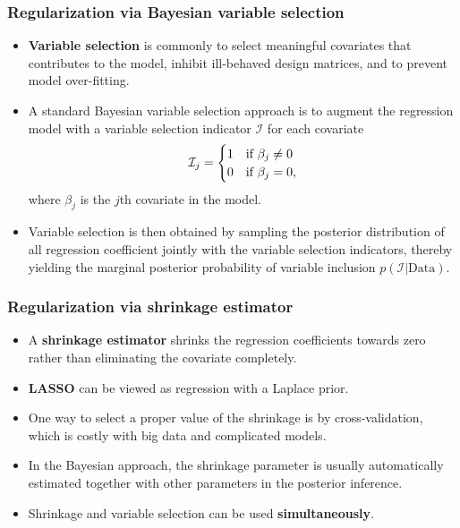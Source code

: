 \documentclass[11pt]{beamer}
\begin{document}
\begin{frame}
  \frametitle{Regularization via Bayesian variable selection}

  \begin{itemize}
  \item \textbf{Variable selection} is commonly to select meaningful covariates that
    contributes to the model, inhibit ill-behaved design matrices, and to
    prevent model over-fitting.

  \item A standard Bayesian variable selection approach \citep{nott2005adaptive} is to augment the
    regression model with a variable selection indicator $\mathcal{I}$ for each
    covariate
    \[
    \mathcal{I}_{j}=\begin{cases}
      1 & \text{if \ensuremath{\beta_{j}\neq0}}\\
      0 & \text{if \ensuremath{\beta_{j}=0}},
    \end{cases}
    \]
    where $\beta_{j}$ is the $j$th covariate in the model.


  \item Variable selection is then obtained by sampling the posterior
    distribution of all regression coefficient jointly with the variable
    selection indicators, thereby yielding the marginal posterior probability of
    variable inclusion $p(\mathcal{I}|\text{Data})$.

  \end{itemize}
\end{frame}

\begin{frame}
  \frametitle{Regularization via shrinkage estimator}

  \begin{itemize}
  \item A \textbf{shrinkage estimator} shrinks the regression coefficients towards zero
    rather than eliminating the covariate completely.
  \item \textbf{LASSO} can be viewed as regression with a Laplace prior.

  \item One way to select a proper value of the shrinkage is by
    cross-validation, which is costly with big data and complicated models.

  \item In the Bayesian approach, the shrinkage parameter is usually
    automatically estimated together with other parameters in the posterior
    inference.

  \item Shrinkage and variable selection can be used \textbf{simultaneously}.

  \end{itemize}

\end{frame}
\end{document}
